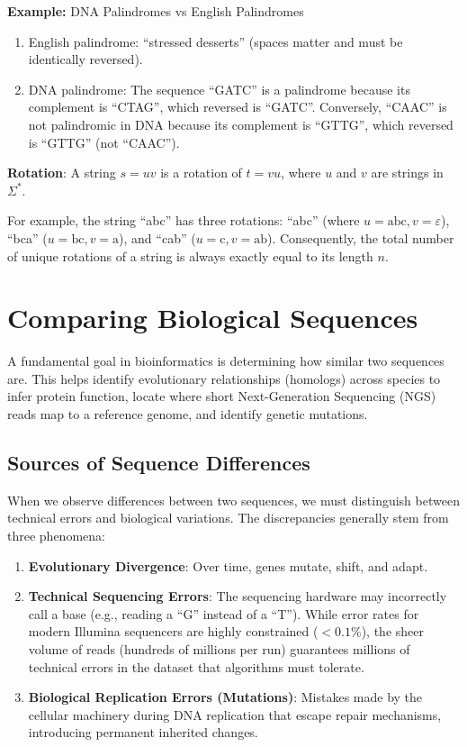 \textbf{Example:}
DNA Palindromes vs English Palindromes
\begin{enumerate}
    \item English palindrome: ``stressed desserts'' (spaces matter and must be identically reversed).
    \item DNA palindrome: The sequence ``GATC'' is a palindrome because its complement is ``CTAG'', which reversed is ``GATC''. Conversely, ``CAAC'' is not palindromic in DNA because its complement is ``GTTG'', which reversed is ``GTTG'' (not ``CAAC'').
\end{enumerate}

\begin{important}
    \textbf{Rotation}: A string \(s = uv\) is a rotation of \(t = vu\), where \(u\) and \(v\) are strings in \(\Sigma^*\).
\end{important}

For example, the string ``abc'' has three rotations: ``abc'' (where \(u=\text{abc}, v=\varepsilon\)), ``bca'' (\(u=\text{bc}, v=\text{a}\)), and ``cab'' (\(u=\text{c}, v=\text{ab}\)). Consequently, the total number of unique rotations of a string is always exactly equal to its length \(n\).

\section{Comparing Biological Sequences}

A fundamental goal in bioinformatics is determining how similar two sequences are. This helps identify evolutionary relationships (homologs) across species to infer protein function, locate where short Next-Generation Sequencing (NGS) reads map to a reference genome, and identify genetic mutations.

\subsection{Sources of Sequence Differences}

When we observe differences between two sequences, we must distinguish between technical errors and biological variations. The discrepancies generally stem from three phenomena:

\begin{enumerate}
    \item \textbf{Evolutionary Divergence}: Over time, genes mutate, shift, and adapt.
    \item \textbf{Technical Sequencing Errors}: The sequencing hardware may incorrectly call a base (e.g., reading a ``G'' instead of a ``T''). While error rates for modern Illumina sequencers are highly constrained (\(<0.1\%\)), the sheer volume of reads (hundreds of millions per run) guarantees millions of technical errors in the dataset that algorithms must tolerate.
    \item \textbf{Biological Replication Errors (Mutations)}: Mistakes made by the cellular machinery during DNA replication that escape repair mechanisms, introducing permanent inherited changes.
\end{enumerate}

